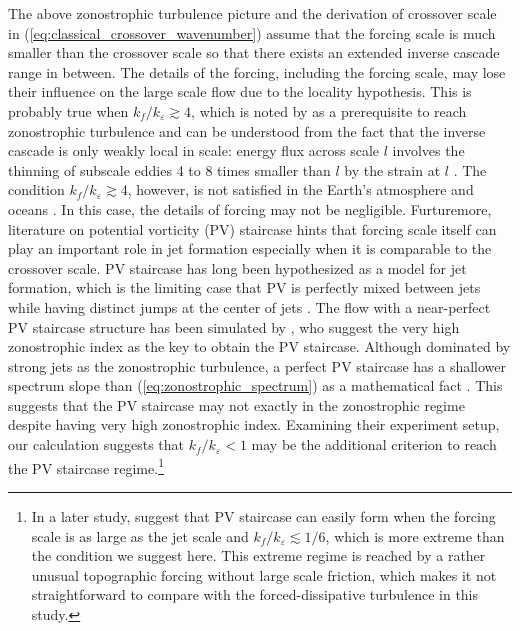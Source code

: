 \documentclass{ametsoc}
\begin{document}
The above zonostrophic turbulence picture and the derivation of
crossover scale in (\ref{eq:classical_crossover_wavenumber}) assume
that the forcing scale is much smaller than the crossover scale so that
there exists an extended inverse cascade range in between.
The details of the forcing, including the forcing scale,
may lose their influence on the large scale flow due to
the locality hypothesis. This is probably true when $k_{f}/k_{\varepsilon}\apprge4$,
which is noted by \citet{Sukoriansky2007} as a prerequisite
to reach zonostrophic turbulence and can be understood from the fact
that the inverse cascade is only weakly local in scale: 
energy flux across scale $l$ involves
the thinning of subscale eddies 4 to 8 times smaller than $l$ by
the strain at $l$ \citep{Chen2006}.
The condition $k_{f}/k_{\varepsilon}\apprge4$, however, 
is not satisfied in the Earth's atmosphere \citep{Schneider2006,Merlis2009}
and oceans \citep{Tulloch2011}. In this case, the details of
forcing may not be negligible. Furturemore, literature 
on potential vorticity (PV) staircase hints that
forcing scale itself can play an important role 
in jet formation especially when it is comparable to the crossover scale.
PV staircase has long been hypothesized
as a model for jet formation, which is the limiting case that PV is
perfectly mixed between jets while having distinct jumps at the center
of jets \citep{Marcus1993,Marcus1998,Dunkerton2008,Dritschel2008}.
The flow with a near-perfect PV staircase structure has been 
simulated by \citet{Scott2012}, who suggest the very high
zonostrophic index as the key to obtain the PV staircase. 
Although dominated by strong jets as the zonostrophic turbulence,
a perfect PV staircase has a shallower spectrum slope than
(\ref{eq:zonostrophic_spectrum}) as a mathematical fact \citep{Saffman1971,Danilov2004}.
This suggests that the PV staircase may not exactly in the zonostrophic
regime despite having very high zonostrophic index.
Examining their experiment setup, our calculation suggests that 
$k_{f}/k_{\varepsilon}<1$ may be the additional criterion
to reach the PV staircase regime.\footnote{
In a later study, \citet{Scott2012a} suggest that PV staircase can
easily form when the forcing scale is as large as the jet scale and
$k_{f}/k_{\varepsilon}\apprle1/6$, which is more extreme than the
condition we suggest here. This extreme regime is reached by a rather
unusual topographic forcing without large scale friction, which makes
it not straightforward to compare with the forced-dissipative turbulence
in this study.} 
\end{document}
